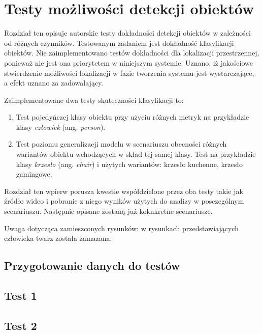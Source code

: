 \chapter{Testy możliwości detekcji obiektów}
Rozdział ten opisuje autorskie testy dokładności detekcji obiektów w zależności od różnych czynników. Testowanym zadaniem jest dokładność klasyfikacji obiektów. Nie zaimplementowano testów dokładności dla lokalizacji przestrzennej, ponieważ nie jest ona priorytetem w niniejszym systemie. Uznano, iż jakościowe stwierdzenie możliwości lokalizacji w fazie tworzenia systemu jest wystarczające, a efekt uznano za zadowalający. 

Zaimplementowane dwa testy skuteczności klasyfikacji to:
\begin{enumerate}
    \item Test pojedyńczej klasy obiektu przy użyciu różnych metryk na przykładzie klasy \emph{człowiek} (ang. \emph{person}). 
    \item  Test poziomu generalizacji modelu w scenariuszu obecności różnych wariantów obiektu wchodzących w skład tej samej klasy. Test na przykładzie klasy \emph{krzesło} (ang. \emph{chair}) i użytych wariantów: krzesło kuchenne, krzesło gamingowe. 
\end{enumerate}
    

Rozdział ten wpierw porusza kwestie współdzielone przez oba testy takie jak źródło wideo i pobranie z niego wyników użytych do analizy w posczególnym scenariuszu. Następnie opisane zostaną już koknkretne scenariusze.
 
Uwaga dotycząca zamieszconych rysunków: w rysunkach przedstawiających człowieka twarz została zamazana.


\section{Przygotowanie danych do testów}


\section{Test 1}


\section{Test 2}


